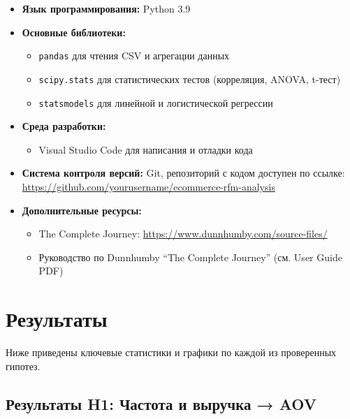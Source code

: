 \documentclass[a4paper]{article}
\begin{document}
\begin{itemize}
  \item \textbf{Язык программирования:} Python 3.9
  \item \textbf{Основные библиотеки:}
    \begin{itemize}
      \item \texttt{pandas} для чтения CSV и агрегации данных
      \item \texttt{scipy.stats} для статистических тестов (корреляция, ANOVA, t-тест)
      \item \texttt{statsmodels} для линейной и логистической регрессии
    \end{itemize}
  \item \textbf{Среда разработки:}
    \begin{itemize}
      \item Visual Studio Code для написания и отладки кода
    \end{itemize}
  \item \textbf{Система контроля версий:} Git, репозиторий с кодом доступен по ссылке:\\
    \url{https://github.com/yourusername/ecommerce-rfm-analysis}
  \item \textbf{Дополнительные ресурсы:}
    \begin{itemize}
      \item The Complete Journey: \url{https://www.dunnhumby.com/source-files/}
      \item Руководство по Dunnhumby “The Complete Journey” (см. User Guide PDF)
    \end{itemize}
\end{itemize}

\section{Результаты}

Ниже приведены ключевые статистики и графики по каждой из проверенных гипотез.

\subsection{Результаты H1: Частота и выручка → AOV}
\end{document}
